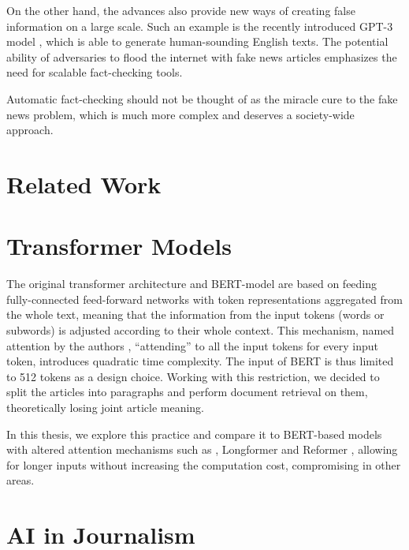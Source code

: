 On the other hand, the advances also provide new ways of creating false information on a large scale. Such an example is the recently introduced GPT-3 model \citep{gpt}, which is able to generate human-sounding English texts.
The potential ability of adversaries to flood the internet with fake news articles emphasizes the need for scalable fact-checking tools.

Automatic fact-checking should not be thought of as the miracle cure to the fake news problem, which is much more complex and deserves a society-wide approach.

\section*{Related Work}

\section*{Transformer Models}

The original transformer architecture \citep{transformers-vaswani} and BERT-model \citep{bert} are based on feeding fully-connected feed-forward networks with token representations aggregated from the whole text, meaning that the information from the input tokens (words or subwords) is adjusted according to their whole context. 
This mechanism, named attention by the authors \citep{transformers-vaswani}, ``attending'' to all the input tokens for every input token, introduces quadratic time complexity. 
The input of BERT is thus limited to 512 tokens as a design choice.
Working with this restriction, we decided to split the \CTK{} articles into paragraphs and perform document retrieval on them, theoretically losing joint article meaning.

In this thesis, we explore this practice and compare it to BERT-based models with altered attention mechanisms such as \nystr{} \citep{nystrom}, Longformer \citep{longformer} and Reformer \citep{reformer}, allowing for longer inputs without increasing the computation cost, compromising in other areas.

\section*{AI in Journalism}

